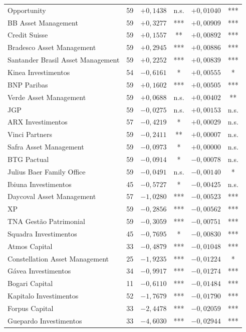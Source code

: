 \documentclass[11pt,a4paper]{article}
\begin{document}
\begin{center}
\begin{longtable}{@{}lrrcrc@{}}
Opportunity & 59 & $+0{,}1438$ & n.s. & $+0{,}01040$ & *** \\
BB Asset Management & 59 & $+0{,}3277$ & *** & $+0{,}00909$ & *** \\
Credit Suisse & 59 & $+0{,}1557$ & ** & $+0{,}00892$ & *** \\
Bradesco Asset Management & 59 & $+0{,}2945$ & *** & $+0{,}00886$ & *** \\
Santander Brasil Asset Management & 59 & $+0{,}2252$ & *** & $+0{,}00839$ & *** \\
Kinea Investimentos & 54 & $-0{,}6161$ & * & $+0{,}00555$ & * \\
BNP Paribas & 59 & $+0{,}1602$ & *** & $+0{,}00505$ & *** \\
Verde Asset Management & 59 & $+0{,}0688$ & n.s. & $+0{,}00402$ & ** \\
JGP & 59 & $-0{,}0275$ & n.s. & $+0{,}00153$ & n.s. \\
ARX Investimentos & 57 & $-0{,}4219$ & * & $+0{,}00029$ & n.s. \\
Vinci Partners & 59 & $-0{,}2411$ & ** & $+0{,}00007$ & n.s. \\
Safra Asset Management & 59 & $-0{,}0973$ & * & $+0{,}00000$ & n.s. \\
BTG Pactual & 59 & $-0{,}0914$ & * & $-0{,}00078$ & n.s. \\
Julius Baer Family Office & 59 & $-0{,}0491$ & n.s. & $-0{,}00140$ & * \\
Ibiuna Investimentos & 45 & $-0{,}5727$ & * & $-0{,}00425$ & n.s. \\
Daycoval Asset Management & 57 & $-1{,}0280$ & *** & $-0{,}00523$ & *** \\
XP & 59 & $-0{,}2856$ & *** & $-0{,}00562$ & *** \\
TNA Gestão Patrimonial & 59 & $-0{,}3059$ & *** & $-0{,}00751$ & *** \\
Squadra Investimentos & 45 & $-0{,}7695$ & * & $-0{,}00830$ & *** \\
Atmos Capital & 33 & $-0{,}4879$ & *** & $-0{,}01048$ & *** \\
Constellation Asset Management & 25 & $-1{,}9235$ & *** & $-0{,}01224$ & * \\
Gávea Investimentos & 34 & $-0{,}9917$ & *** & $-0{,}01274$ & *** \\
Bogari Capital & 11 & $-0{,}6110$ & *** & $-0{,}01484$ & *** \\
Kapitalo Investimentos & 52 & $-1{,}7679$ & *** & $-0{,}01790$ & *** \\
Forpus Capital & 33 & $-2{,}4478$ & *** & $-0{,}02059$ & *** \\
Guepardo Investimentos & 33 & $-4{,}6030$ & *** & $-0{,}02944$ & *** \\
\end{longtable}
\end{center}
\end{document}
